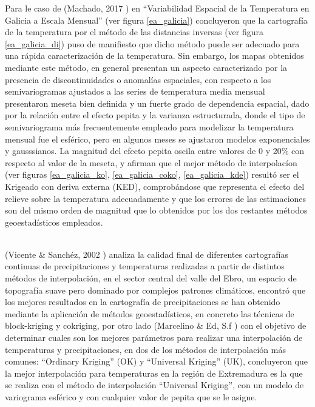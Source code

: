 Para le caso de (Machado, 2017 \cite{galicia_ea}) en ``Variabilidad Espacial de la Temperatura  en Galicia a Escala Mensual'' (ver figura \ref{ea_galicia}) concluyeron que  la cartografía de la temperatura por el método de las distancias inversas (ver figura \ref{ea_galicia_di}) puso de manifiesto que dicho método puede ser adecuado para una rápida caracterización de la temperatura.  Sin  embargo,  los  mapas  obtenidos  mediante  este  método,  en  general  presentan  un  aspecto  caracterizado  por  la  presencia  de  discontinuidades  o  anomalías  espaciales, con respecto a los  semivariogramas  ajustados  a  las  series  de  temperatura  media  mensual  presentaron meseta bien definida y un fuerte grado de dependencia espacial, dado por la relación entre el efecto pepita y la varianza estructurada, donde el  tipo  de  semivariograma  más  frecuentemente  empleado para modelizar la temperatura mensual fue el esférico, pero en algunos meses se ajustaron modelos exponenciales y gausssianos. La magnitud del efecto pepita oscila entre valores de 0 y 20\% con respecto al valor de la meseta, y afirman que el  mejor  método  de  interpolacíon (ver figuras \ref{ea_galicia_ko}, \ref{ea_galicia_coko}, \ref{ea_galicia_kde}) resultó  ser  el  Krigeado  con  deriva  externa  (KED),   comprobándose  que  representa  el  efecto  del  relieve  sobre  la  temperatura  adecuadamente y que los errores de las estimaciones son del mismo orden de magnitud que  lo  obtenidos  por  los  dos  restantes  métodos  geoestadísticos  empleados. 

\\
 (Vicente & Sanchéz, 2002 \cite{vicente_ea})  analiza la calidad final de diferentes cartografías continuas
de precipitaciones y temperaturas realizadas a partir de distintos métodos de interpolación, en el sector central del valle del Ebro, un espacio de topografía suave pero dominado por complejos patrones climáticos, encontró que los mejores resultados en la cartografía de precipitaciones se han obtenido mediante la aplicación de métodos
geoestadísticos, en concreto las técnicas de block-kriging y cokriging, por otro lado (Marcelino & Ed, S.f \cite{marcelino_ea})  con el objetivo de determinar  cuales  son  los  mejores parámetros    para    realizar    una    interpolación    de temperaturas y precipitaciones,  en  dos  de  los métodos  de  interpolación  más  comunes:  “Ordinary Kriging”    (OK)    y    “Universal    Kriging”    (UK), concluyeron que la mejor interpolación para temperaturas en la región de Extremadura es la que se realiza con el método de interpolación  “Universal  Kriging”,  con  un  modelo de  variograma  esférico  y  con  cualquier  valor  de pepita  que  se  le  asigne. 






